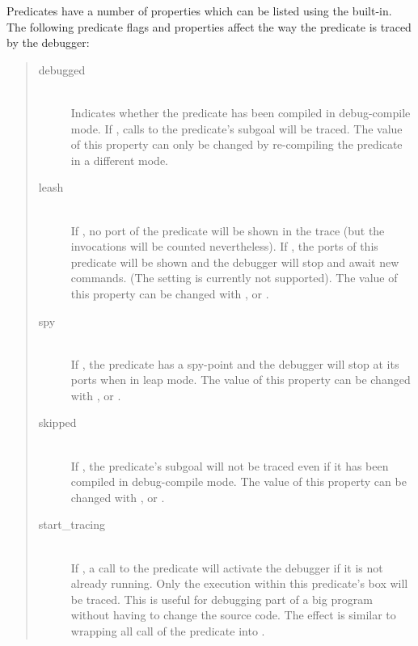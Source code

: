 Predicates have a number of properties which can be listed using the
 built-in.
The following predicate flags and properties affect the way the
predicate is traced by the debugger:
\begin{quote}
\begin{description}
\item[debugged]\mbox{}\\
        Indicates whether the predicate has been compiled in debug-compile mode.
        If , calls to the predicate's subgoal will be traced.
        The value of this property can only be changed by re-compiling
        the predicate in a different mode.

\item[leash]\mbox{}\\
        If , no port of the predicate will be shown
        in the trace (but the invocations will be counted nevertheless).
        If , the ports of this predicate will be shown and
        the debugger will stop and await new commands.
        (The  setting is currently not supported).
        The value of this property can be changed with
        ,
         or
        .

\item[spy]\mbox{}\\
        If , the predicate has a spy-point and the debugger will
        stop at its ports when in leap mode.
        The value of this property can be changed with
        ,
         or
        .

\item[skipped]\mbox{}\\
        If , the predicate's subgoal will not be traced even
        if it has been compiled in debug-compile mode.
        The value of this property can be changed with
        ,
         or
        .

\item[start_tracing]\mbox{}\\
        If , a call to the predicate will activate the debugger if
        it
        is not already running.
        Only the execution within this predicate's box will be traced.
        This is useful for debugging part of a big
        program without having to change the source code.
        The effect is similar to wrapping all call of the predicate into
        .
\end{description}
\end{quote}



